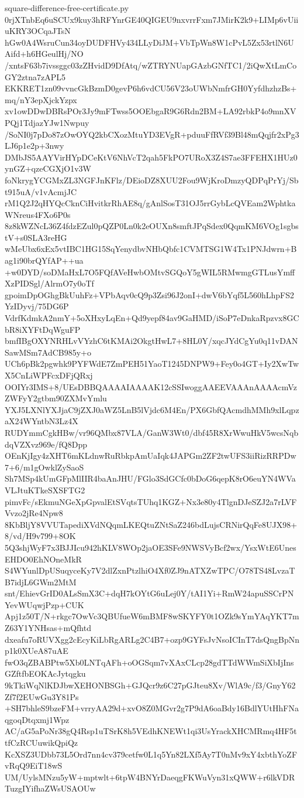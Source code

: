 \documentclass[11pt]{article}
\theoremstyle{definition}
\theoremstyle{remark}
\begin{document}
\begin{filecontents*}[overwrite]{square-difference-free-certificate.py}
0rjXTnbEq6uSCUx9kuy3hRFYnrGE40QIGEU9nxvrrFxm7JMirK2k9+LIMp6vUiiuKRY3OCqaJTsN
hGw0A4WsruCun34oyDUDFHVy434LLyDiJM+VbTpWn8W1cPvL5Zx53rtlN6UAifd+h6HGeulHj/NO
/xntsF63b7ivssggc03zZHvidD9DfAtq/wZTRYNUapGAzbGNfTC1/2iQwXtLmCoGY2ztna7zAPL5
EKKRET1zn09vvncGkBzmD0gevP6h6vdCU56V23oUWbNmfrGH0YyfdhzhzBs+mq/nY3epXjckYzpx
xv1owDDwDBRsPOr3Jy9mFTwss5OOEbgaR9G6Rdn2BM+LA92rbkP4o9mnXVPQj1TdjazYJw1Nwpuy
/SoNI0j7pDo87zOwOYQ2kbCXozMtuYD3EVgR+pduuFfRVf39Bl48mQqjfr2xPg3LJ6p1e2p+3nwy
DMbJS5AAYVirHYpDCeKtV6NhVcT2qah5FkPO7URoX3Z4S7ae3FFEHX1HUz0ynGZ+qzeCGXjO1v3W
foNkrygYCGMxZL3NGFJnKFlz/DEioDZ8XUU2Fou9WjKroDmzyQDPqPrYj/Sbt915uA/v1vAcmjJC
rM1Q2J2qHYQcCknCiHvitkrRhAE8q/gAnlSosT31OJ5rrGybLcQVEam2WphtkaWNreus4FXo6P0s
8z8kWZNcL36Z4fdzEZul0pQZP0Ln0k2eOUXn8smftJPqSdex0QqmKM6VOg1sgbstV+s0SLA3reHG
wMeUbx6xEx5vtIBC1HG15SqYenydbvNHbQbfc1CVMTSG1W4Tx1PNJdwrn+Bag1i90brQYfAP++ua
+w0DYD/soDMaHxL7O5FQfAVeHwbOMtvSGQoY5gWIL5RMwmgGTLusYmffXzPIDSgl/AlrmO7y0oTf
gpoimDpOGhgBkUuhFz+VPbAqv0cQ9p3Zsi96J2onI+dwV6bYqf5L560hLhpFS2YzIDyvj/75DG6P
VdrfKdmkA2nmY+5oXHxyLqEn+Qd9yepf84av9GaHMD/iSoP7eDnkaRpzvx8GCbR8iXYFtDqWguFP
bmfIBgOXYNRHLvVYzhC6tKMAi2OkgtHwL7+8HL0Y/xqcJYdCgYu0q11vDANSawMSm7AdCB985y+o
UCh6pBk2pgwhk9PYFWdE7ZmPEH51YaoT1245DNPW9+Fey0o4GT+Iy2XwTwX5CnLiWPFcxDFjQRxj
OOIYr3IMS+8/UEsDBBQAAAAIAAAAK12cSSIwoggAAEEVAAAnAAAAcmVzZWFyY2gtbm90ZXMvYmlu
YXJ5LXNlYXJjaC9jZXJ0aWZ5LnB5lVjdc6M4En/PX6GbfQAcmdhMMh9xlLqpzaX24WYntbN3Lz4X
RUDYmmCgkHBw/vr96QMbx87VLA/GanW3Wt0/dbf45R8XrWwuHkV5wcsNqbdqVZXvz969e/fQ8Dpp
OEnKjIgy4zXHT6mKLdnwRuRbkpAmUaIqk4JAPGm2ZF2twUFS3iiRizRRPDw7+6/m1gOwklZySaoS
Sh7MSp4kUmGFpMlIIR4baAnJHU/FGlo3SdGCfc0bDoG6qepK8rO6euYN4WVaVLJtuKTkeSXSFTG2
pimvFc/sEkmuNGeXpGpvalEtSVqtsTUhq1KGZ+Nx3e80y4TlgnDJeSZJ2a7rLVFVvzo2jRe4Npw8
8KbBljY8VVUTapediXVdNQqmLKEQtuZNtSaZ246bdLujsCRNirQqFe8UJX98+8/vd/H9v799+8OK
5Q3shjWyF7x3BJJIcu942hKLV8WOp2jaOE3SFe9NWSVyBcf2wx/YsxWtE6UnesEHDO0EhNOneMkR
S4WYunlDpUSuqyceKy7V2dlZxnPtzlhiO4Xf0ZJ9nATXZwTPC/O78TS48LvzaTB7idjL6GWm2MtM
snt/EhievGrID0ALsSmX3C+dqH7kOYtG6uLej0Y/tAI1Yi+RmW24apuSSCrPNYevWUqwjPzp+CUK
Apj1z50T/N+rkgc7OwVc3QBUfueW6mBMF8wSKYFY0t1OZk9sYmYAqYKT7mZ63Y1YNHsas+mQfhtd
dxeafu7oRUVXgg2cEcyKiLbRgARLg2C4B7+ozp9GYFsJvNsoICInT7dsQngBpNnp1k0XUeA87uAE
fwO3qZBABPtw5Xb0LNTqAFh+oOGSqm7vXAxCLcp28gdTTdWWmSiXbIjInsGZftfbEOKAcJytqgku
9kTkiWqNlKDJbwXEHONBSGh+GJQcr9z6C27pGJteu8Xv/WlA9c/f3/GnyY62Zf7f2EUwGu3Y81Ps
+SH7bhleS9bzeFM+vrryAA29d+xvO8Z0MGvr2g7P9dA6oaBdy16BdlYUtHhFNaqgoqDtqxmj1Wpz
AC/aG5aPoNr38gQ4Rsp1uTSrK8h5VEdhKNEWt1qi3UsYrackXHCMRmq4HF5ttfCzRCUuwikQpiQz
KcXSZ3UDbb73L5Ord7nn4cv379cetfw0L1q5Yn82LXf5Ay7T0nMv9xY4xbthYoZFvRqQ9EiT18wS
UM/UylsMNzu5yW+mptwlt+6tpW4BNYrDaeqgFKWuVyn31xQWW+r6lkVDRTuzgIYifhaZWsUSAOUw

\end{filecontents*}
\end{document}
